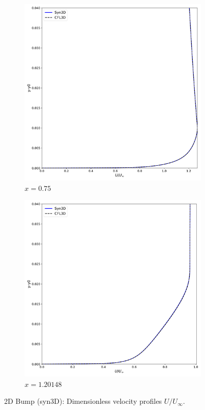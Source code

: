 \begin{figure}[ht!]
\centering
\begin{subfigure}{.45\textwidth}
  \centering
  \includegraphics[width=1.0\textwidth]{figs/2dbump/u75.pdf}
  \caption{$x=0.75$}
\end{subfigure}%
\begin{subfigure}{.45\textwidth}
  \centering
  \includegraphics[width=1.0\textwidth]{figs/2dbump/u120148.pdf}
  \caption{$x=1.20148$}
\end{subfigure}
\caption{2D Bump (syn3D): Dimensionless velocity profiles $U/U_\infty$.}
\label{fig:syn2dbumpu}
\end{figure}

